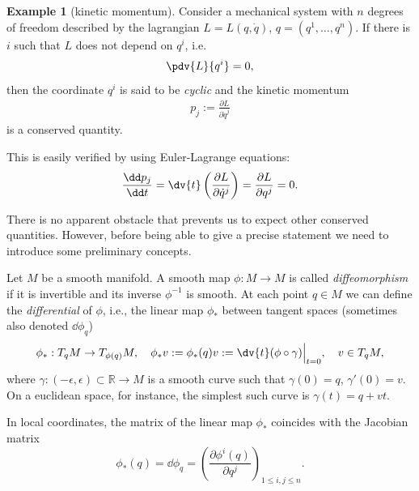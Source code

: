 \documentclass[english,fontsize=11pt,paper=b5]{scrbook}
\numberwithin{equation}{chapter}
\theoremstyle{definition}
\newtheorem{example}{Example}[chapter]
\begin{document}
    \begin{example}[kinetic momentum]\label{ex:linearm}
      Consider a mechanical system with $n$ degrees of freedom described by the lagrangian $L=L(q,\dot q)$, $q=(q^1,\ldots,q^n)$.
      If there is $i$ such that $L$ does not depend on $q^i$, i.e.
      \begin{eqnarray}
        \pdv{L}{q^i} = 0,
      \end{eqnarray}
      then the coordinate $q^i$ is said to be \emph{cyclic} and the kinetic momentum
      \begin{eqnarray}
        p_j := \frac{\partial L}{\partial\dot q^j}
      \end{eqnarray}
      is a conserved quantity.

      This is easily verified by using Euler-Lagrange equations:
      \begin{eqnarray}
        \frac{\dd p_j}{\dd t} =
        \dv{t} \left(\frac{\partial L}{\partial \dot q^j}\right)=
        \frac{\partial L}{\partial q^j} = 0.
      \end{eqnarray}
    \end{example}

    There is no apparent obstacle that prevents us to expect other conserved quantities. However, before being able to give a precise statement we need to introduce some preliminary concepts.

    Let $M$ be a smooth manifold. A smooth map $\phi : M \to M$ is called \emph{diffeomorphism} if it is invertible and its inverse $\phi^{-1}$ is smooth. At each point $q\in M$ we can define the \emph{differential} of $\phi$, i.e., the linear map $\phi_*$ between tangent spaces (sometimes also denoted $\dd\phi_q$)
    \begin{equation}
      \phi_*: T_q M \to T_{\phi(q)} M,
      \quad \phi_* v := \phi_*(q) v := \dv{t} (\phi \circ \gamma) \Big|_{t=0},
      \quad v\in T_q M,
    \end{equation}
    where $\gamma:(-\epsilon, \epsilon)\subset\mathbb{R} \to M$ is a smooth curve such that $\gamma(0)=q$, $\gamma'(0) = v$.
    On a euclidean space, for instance, the simplest such curve is $\gamma(t) = q + v t$.

    In local coordinates, the matrix of the linear map $\phi_*$ coincides with the Jacobian matrix
    \begin{equation}
      \phi_*(q) = \dd \phi_q = \left(\frac{\partial \phi^i(q)}{\partial q^j}\right)_{1\leq i,j\leq n}.
    \end{equation}
\end{document}
